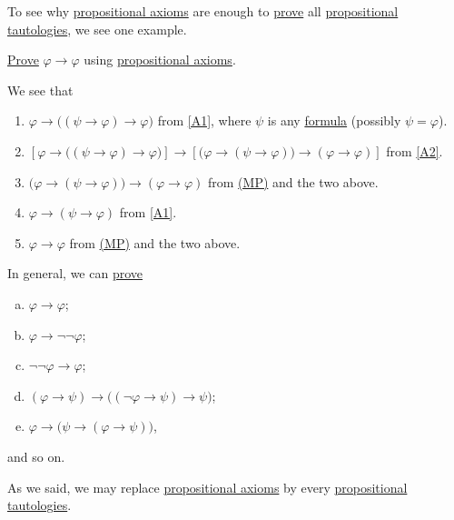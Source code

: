 To see why \hyperref[def:propositional-axioms]{propositional axioms} are enough to \hyperref[def:proof]{prove} all \hyperref[def:propositional-tautology]{propositional tautologies}, we see one example.

\begin{problem*}\label{prob:lec6}
	\hyperref[def:proof]{Prove} \(\varphi \to \varphi \) using \hyperref[def:propositional-axioms]{propositional axioms}.
\end{problem*}
\begin{answer}
	We see that
	\begin{enumerate}
		\item \(\varphi \to  \big((\psi \to \varphi ) \to \varphi \big)\) from \autoref{A1}, where \(\psi \) is any \hyperref[def:formula]{formula} (possibly \(\psi =\varphi \)).
		\item \(\left[ \varphi \to \big((\psi \to \varphi) \to \varphi \big) \right] \to  \left[ \big(\varphi \to (\psi \to \varphi )\big) \to (\varphi \to \varphi ) \right] \) from \autoref{A2}.
		\item \(\big(\varphi \to (\psi \to \varphi )\big) \to (\varphi \to \varphi )\) from \hyperref[def:rule-of-inference]{(MP)} and the two above.
		\item \(\varphi \to (\psi \to \varphi )\) from \autoref{A1}.
		\item \(\varphi \to \varphi \) from \hyperref[def:rule-of-inference]{(MP)} and the two above.
	\end{enumerate}
\end{answer}

In general, we can \hyperref[def:proof]{prove}
\begin{multicols}{2}
	\begin{enumerate}[(a)]
		\item \(\varphi \to \varphi \);
		\item \(\varphi \to \lnot \lnot \varphi \);
		\item \(\lnot \lnot \varphi \to \varphi \);
		\item \((\varphi \to \psi ) \to  \big((\lnot \varphi \to \psi ) \to \psi \big)\);
		\item \(\varphi \to \big(\psi \to (\varphi \to \psi )\big)\),
	\end{enumerate}
\end{multicols}
and so on.

\begin{note}
	As we said, we may replace \hyperref[def:propositional-axioms]{propositional axioms} by every \hyperref[def:propositional-tautology]{propositional tautologies}.
\end{note}

